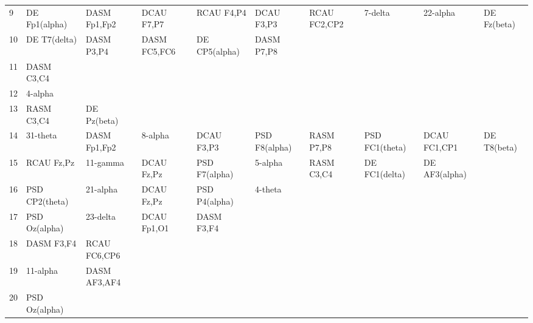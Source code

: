 \begin{landscape}
\begin{table}[]
\begin{tabular}{l|llllllll}
9        & DE Fp1(alpha)  & DASM Fp1,Fp2   & DCAU F7,P7     & RCAU F4,P4     & DCAU F3,P3     & RCAU FC2,CP2   & 7-delta        & 22-alpha       & DE Fz(beta)   &              \\
10       & DE T7(delta)   & DASM P3,P4     & DASM FC5,FC6   & DE CP5(alpha)  & DASM P7,P8     &                &                &                &               &              \\
11       & DASM C3,C4     &                &                &                &                &                &                &                &               &              \\
12       & 4-alpha        &                &                &                &                &                &                &                &               &              \\
13       & RASM C3,C4     & DE Pz(beta)    &                &                &                &                &                &                &               &              \\
14       & 31-theta       & DASM Fp1,Fp2   & 8-alpha        & DCAU F3,P3     & PSD F8(alpha)  & RASM P7,P8     & PSD FC1(theta) & DCAU FC1,CP1   & DE T8(beta)   &              \\
15       & RCAU Fz,Pz     & 11-gamma       & DCAU Fz,Pz     & PSD F7(alpha)  & 5-alpha        & RASM C3,C4     & DE FC1(delta)  & DE AF3(alpha)  &               &              \\
16       & PSD CP2(theta) & 21-alpha       & DCAU Fz,Pz     & PSD P4(alpha)  & 4-theta        &                &                &                &               &              \\
17       & PSD Oz(alpha)  & 23-delta       & DCAU Fp1,O1    & DASM F3,F4     &                &                &                &                &               &              \\
18       & DASM F3,F4     & RCAU FC6,CP6   &                &                &                &                &                &                &               &              \\
19       & 11-alpha       & DASM AF3,AF4   &                &                &                &                &                &                &               &              \\
20       & PSD Oz(alpha)  &                &                &                &                &                &                &                &               &              \\

\end{tabular}
\end{table}
\end{landscape}
